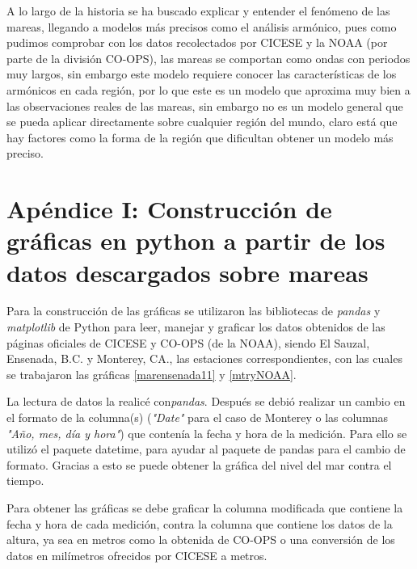 A lo largo de la historia se ha buscado explicar y entender el fenómeno de las mareas, llegando a modelos más precisos como el análisis armónico, pues como pudimos comprobar con los datos recolectados por CICESE y la NOAA (por parte de la división CO-OPS), las mareas se comportan como ondas con periodos muy largos, sin embargo este modelo requiere conocer las características de los armónicos en cada región, por lo que este es un modelo que aproxima muy bien a las observaciones reales de las mareas, sin embargo no es un modelo general que se pueda aplicar directamente sobre cualquier región del mundo, claro está que hay factores como la forma de la región que dificultan obtener un modelo más preciso.

\nocite{mareas}
\nocite{teotide}
\nocite{cicese}
\nocite{noaa}

\newpage

\section*{Apéndice I:  Construcción de gráficas en python a partir de los datos descargados sobre mareas}

Para la construcción de las gráficas se utilizaron las bibliotecas de \textit{pandas} y \textit{matplotlib} de Python para leer, manejar y graficar los datos obtenidos de las páginas oficiales de CICESE y CO-OPS (de la NOAA), siendo El Sauzal, Ensenada, B.C. y Monterey, CA., las estaciones correspondientes, con las cuales se trabajaron las gráficas \ref{marensenada11} y \ref{mtryNOAA}. 

La lectura de datos la realicé con\textit{pandas}. Después se debió realizar un cambio en el formato de la columna(s) (\textit{"Date"} para el caso de Monterey  o las columnas \textit{"Año, mes, día y hora"}) que contenía la fecha y hora de la medición. Para ello se utilizó el paquete datetime, para ayudar al paquete de pandas para el cambio de formato.  Gracias a esto se puede obtener la gráfica del nivel del mar contra el tiempo.

Para obtener las gráficas se debe graficar la columna modificada que contiene la fecha y hora de cada medición, contra la columna que contiene los datos de la altura, ya sea en metros como la obtenida de CO-OPS o una conversión de los datos en milímetros ofrecidos por CICESE a metros.

